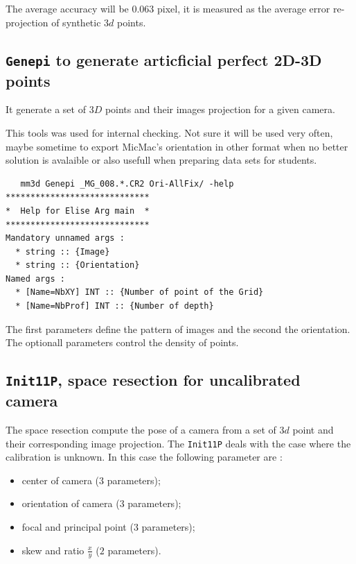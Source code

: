 The average accuracy will be $0.063$ pixel, it is measured as the average error re-projection of  synthetic $3d$ points.



\subsection{{\tt Genepi} to generate articficial perfect 2D-3D points}

It generate a set of $3D$ points and their images projection for a given camera.

This tools was used for internal checking. Not sure it will be used very often, maybe sometime to export 
MicMac's orientation in other format when no better solution is avalaible or also usefull when preparing
data sets for students.

\begin{verbatim}
   mm3d Genepi _MG_008.*.CR2 Ori-AllFix/ -help
*****************************
*  Help for Elise Arg main  *
*****************************
Mandatory unnamed args : 
  * string :: {Image}
  * string :: {Orientation}
Named args : 
  * [Name=NbXY] INT :: {Number of point of the Grid}
  * [Name=NbProf] INT :: {Number of depth}

\end{verbatim}

The first parameters define the  pattern of images and the second the orientation. The optionall parameters control
the density of points.



\subsection{{\tt Init11P}, space resection for uncalibrated camera}

The space resection compute the pose of a camera from a set of $3d$ point and their corresponding
image projection. The {\tt Init11P} deals with the case where the calibration is unknown. In this case the
following parameter are :


\begin {itemize}
    \item center of camera ($3$ parameters);
    \item orientation of camera ($3$ parameters);
    \item focal and principal point ($3$ parameters);
    \item skew and ratio $\frac xy$ ($2$ parameters).
\end {itemize}

